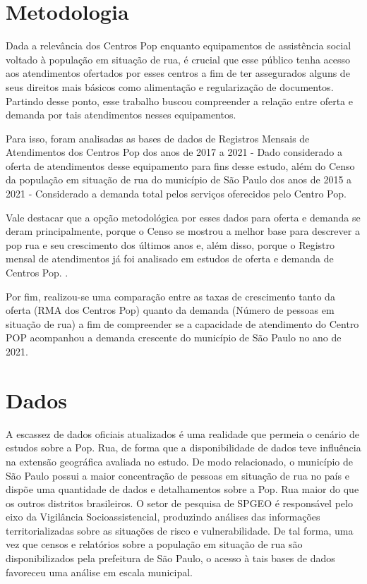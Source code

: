 \section{Metodologia}

Dada a relevância dos Centros Pop enquanto equipamentos de assistência social voltado à população em situação de rua, é crucial que esse público tenha acesso aos atendimentos ofertados por esses centros a fim de ter assegurados alguns de seus direitos mais básicos como alimentação e regularização de documentos. Partindo desse ponto, esse trabalho buscou compreender a relação entre oferta e demanda por tais atendimentos nesses equipamentos.

Para isso, foram analisadas as bases de dados de Registros Mensais de Atendimentos dos Centros Pop dos anos de 2017 a 2021 - Dado considerado a oferta de atendimentos desse equipamento para fins desse estudo, além do Censo da população em situação de rua do município de São Paulo dos anos de 2015 a 2021 - Considerado a demanda total pelos serviços oferecidos pelo Centro Pop.

Vale destacar que a opção metodológica por esses dados para oferta e demanda se deram principalmente, porque o Censo se mostrou a melhor base para descrever a pop rua e seu crescimento dos últimos anos e, além disso, porque o Registro mensal de atendimentos já foi analisado em estudos de oferta e demanda de Centros Pop. \cite{secretariaPernambuco}.

Por fim, realizou-se uma comparação entre as taxas de crescimento tanto da oferta (RMA dos Centros Pop) quanto da demanda (Número de pessoas em situação de rua) a fim de compreender se a capacidade de atendimento do Centro POP acompanhou a demanda crescente do município de São Paulo no ano de 2021.

\section{Dados}

A escassez de dados  oficiais atualizados é uma realidade que permeia o cenário de estudos sobre a Pop. Rua, de forma que a disponibilidade de dados teve influência na extensão geográfica avaliada no estudo. De modo relacionado, o município de São Paulo possui a maior concentração de pessoas em situação de rua no país e dispõe uma quantidade de dados e detalhamentos sobre a Pop. Rua maior do que os outros distritos brasileiros. O setor de pesquisa de SPGEO é responsável pelo eixo da Vigilância Socioassistencial, produzindo análises das informações territorializadas sobre as situações de risco e vulnerabilidade. De tal forma, uma vez que censos e relatórios sobre a população em situação de rua são disponibilizados pela prefeitura de São Paulo, o acesso à tais bases de dados favoreceu uma análise em escala municipal. 

